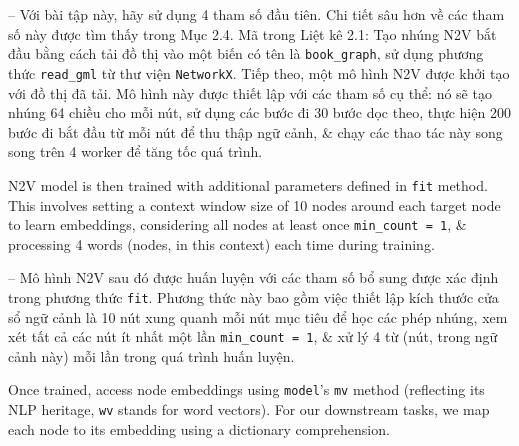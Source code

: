 \documentclass{article}
\begin{document}
\begin{itemize}
\begin{itemize}
\begin{itemize}
           -- Với bài tập này, hãy sử dụng 4 tham số đầu tiên. Chi tiết sâu hơn về các tham số này được tìm thấy trong Mục 2.4. Mã trong {\sf Liệt kê 2.1: Tạo nhúng N2V} bắt đầu bằng cách tải đồ thị vào một biến có tên là \verb|book_graph|, sử dụng phương thức \verb|read_gml| từ thư viện {\tt NetworkX}. Tiếp theo, một mô hình N2V {\tt} được khởi tạo với đồ thị đã tải. Mô hình này được thiết lập với các tham số cụ thể: nó sẽ tạo nhúng 64 chiều cho mỗi nút, sử dụng các bước đi 30 bước dọc theo, thực hiện 200 bước đi bắt đầu từ mỗi nút để thu thập ngữ cảnh, \& chạy các thao tác này song song trên 4 worker để tăng tốc quá trình.

           N2V model is then trained with additional parameters defined in {\tt fit} method. This involves setting a context window size of 10 nodes around each target node to learn embeddings, considering all nodes at least once \verb|min_count = 1|, \& processing 4 words (nodes, in this context) each time during training.

           -- Mô hình N2V sau đó được huấn luyện với các tham số bổ sung được xác định trong phương thức {\tt fit}. Phương thức này bao gồm việc thiết lập kích thước cửa sổ ngữ cảnh là 10 nút xung quanh mỗi nút mục tiêu để học các phép nhúng, xem xét tất cả các nút ít nhất một lần \verb|min_count = 1|, \& xử lý 4 từ (nút, trong ngữ cảnh này) mỗi lần trong quá trình huấn luyện.

           Once trained, access node embeddings using {\tt model}'s {\tt mv} method (reflecting its NLP heritage, {\tt wv} stands for word vectors). For our downstream tasks, we map each node to its embedding using a dictionary comprehension.


\end{itemize}
\end{itemize}
\end{itemize}
\end{document}

